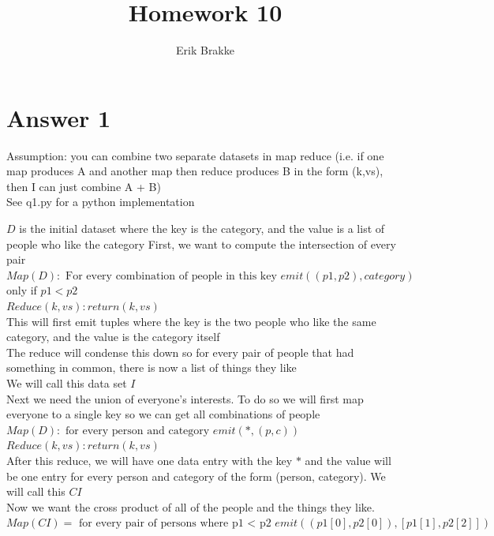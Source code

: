 \documentclass[11pt]{article}
\theoremstyle{definition}
\begin{document}
\title{Homework 10}
\author{Erik Brakke}
\maketitle

\thispagestyle{fancy}


\section*{Answer 1}
Assumption: you can combine two separate datasets in map reduce (i.e. if one map produces A and another map then reduce produces B in the form (k,vs), then I can just combine A + B)\\

See q1.py for a python implementation

$D$ is the initial dataset where the key is the category, and the value is a list of people who like the category
First, we want to compute the intersection of every pair\\
$Map(D): \text{ For every combination of people in this key } emit((p1, p2), category)$ only if $p1 < p2$\\
$Reduce(k, vs): return (k, vs)$\\
This will first emit tuples where the key is the two people who like the same category, and the value is the category itself\\
The reduce will condense this down so for every pair of people that had something in common, there is now a list of things they like\\
We will call this data set $I$\\
\newline
Next we need the union of everyone's interests.  To do so we will first map everyone to a single key so we can get all combinations of people\\
$Map(D): \text{ for every person and category } emit(*, (p, c))$\\
$Reduce(k, vs): return (k, vs)$\\
After this reduce, we will have one data entry with the key $*$ and the value will be one entry for every person and category of the form (person, category).  We will call this $CI$\\
\newline
Now we want the cross product of all of the people and the things they like.\\
$Map(CI) = \text{ for every pair of persons where p1 < p2 } emit((p1[0],p2[0]), [p1[1], p2[2]])$\\
\end{document}

